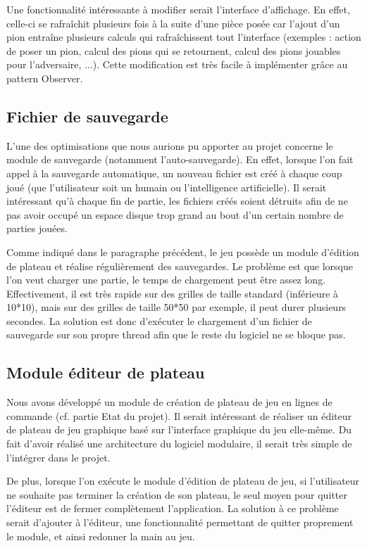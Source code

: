 \documentclass[a4paper,12pt]{report}
\begin{document}
Une fonctionnalité intéressante à modifier serait l’interface d’affichage. En effet, celle-ci se rafraîchit plusieurs fois à la suite d’une pièce posée car l’ajout d’un pion entraîne plusieurs calculs qui rafraîchissent tout l’interface (exemples : action de poser un pion, calcul des pions qui se retournent, calcul des pions jouables pour l’adversaire, ...). Cette modification est très facile à implémenter grâce au pattern Observer.


\subsection{Fichier de sauvegarde}

L’une des optimisations que nous aurions pu apporter au projet concerne le module de sauvegarde (notamment l’auto-sauvegarde). En effet, lorsque l’on fait appel à la sauvegarde automatique, un nouveau fichier est créé à chaque coup joué (que l’utilisateur soit un humain ou l’intelligence artificielle). Il serait intéressant qu’à chaque fin de partie, les fichiers créés soient détruits afin de ne pas avoir occupé un espace disque trop grand au bout d’un certain nombre de parties jouées.

Comme indiqué dans le paragraphe précédent, le jeu possède un module d’édition de plateau et réalise régulièrement des sauvegardes. Le problème est que lorsque l’on veut charger une partie, le temps de chargement peut être assez long. Effectivement, il  est très rapide sur des grilles de taille standard (inférieure à 10*10), mais sur des grilles de taille 50*50 par exemple, il peut durer plusieurs secondes. La solution est donc d’exécuter le chargement d’un fichier de sauvegarde sur son propre thread afin que le reste du logiciel ne se bloque pas. 


\subsection{Module éditeur de plateau}

Nous avons développé un module de création de plateau de jeu en lignes de commande (cf. partie Etat du projet). Il serait intéressant de réaliser un éditeur de plateau de jeu graphique basé sur l’interface graphique du jeu elle-même. Du fait d’avoir réalisé une architecture du logiciel modulaire, il serait très simple de l’intégrer dans le projet.

De plus, lorsque l'on exécute le module d'édition de plateau de jeu, si l’utilisateur ne souhaite pas terminer la création de son plateau, le seul moyen pour quitter l’éditeur est de fermer complètement l’application. La solution à ce problème serait d’ajouter à l’éditeur, une fonctionnalité permettant de quitter proprement le module, et ainsi redonner la main au jeu.
\end{document}
